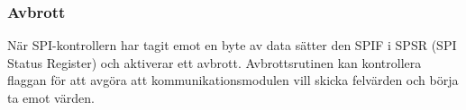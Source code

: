 \documentclass[designspec/spec.tex]{subfiles}
\begin{document}
\subsubsection{Avbrott} \label{sec:ctrl-int}
När SPI-kontrollern har tagit emot en byte av data sätter den SPIF i SPSR (SPI
Status Register) och aktiverar ett avbrott. Avbrottsrutinen kan kontrollera
flaggan för att avgöra att kommunikationsmodulen vill skicka felvärden och
börja ta emot värden.
\end{document}
